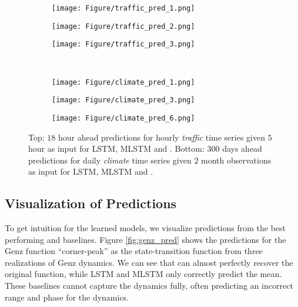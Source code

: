 \begin{figure}[ht]
\begin{center}
    \begin{subfigure}[b]{0.3\textwidth}
        \texttt{[image: Figure/traffic\_pred\_1.png]}
    \end{subfigure}
    \begin{subfigure}[b]{0.32\textwidth}
        \texttt{[image: Figure/traffic\_pred\_2.png]}
    \end{subfigure}
    \begin{subfigure}[b]{0.3\textwidth}
        \texttt{[image: Figure/traffic\_pred\_3.png]}
    \end{subfigure}\\
    \begin{subfigure}[b]{0.32\textwidth}
        \texttt{[image: Figure/climate\_pred\_1.png]}
    \end{subfigure}
    \begin{subfigure}[b]{0.32\textwidth}
        \texttt{[image: Figure/climate\_pred\_3.png]}
    \end{subfigure}
    \begin{subfigure}[b]{0.32\textwidth}
        \texttt{[image: Figure/climate\_pred\_6.png]}
    \end{subfigure}
    \caption{Top: $18$ hour ahead predictions for hourly \textsl{traffic} time series  given $5$ hour as input for LSTM, MLSTM and \tlstm{}.
%
    Bottom: $300$ days ahead predictions for daily \textsl{climate} time series given $2$ month observations as input for LSTM, MLSTM and \tlstm{}.}
    \label{fig:pred_vis}
\end{center}
        \vskip -0.2in
\end{figure}
\subsection{Visualization of Predictions}
%
To get intuition for the learned models, we visualize predictions from the best performing \tlstm{} and baselines.  Figure \ref{fig:genz_pred}  shows the  predictions for the Genz function ``corner-peak'' as the state-transition function from three realizations of Genz dynamics. We can see that \tlstm{} can almost perfectly recover the original function, while LSTM and MLSTM only correctly predict the mean. These baselines cannot capture the dynamics fully, often predicting an incorrect range and phase for the dynamics.


